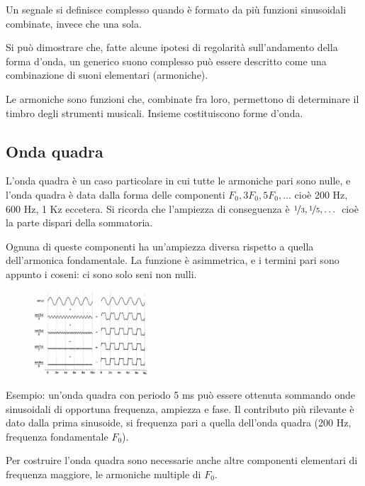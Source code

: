Un segnale si definisce complesso quando è formato da più funzioni sinusoidali combinate, invece che una sola.

Si può dimostrare che, fatte alcune ipotesi di regolarità sull'andamento della forma d'onda, un generico suono complesso può essere descritto come una combinazione di suoni elementari (armoniche).

Le armoniche sono funzioni che, combinate fra loro, permettono di determinare il timbro degli strumenti musicali. Insieme costituiscono forme d'onda. 

\subsection{Onda quadra}
L'onda quadra è un caso particolare in cui tutte le armoniche pari sono nulle, e l'onda quadra è data dalla forma delle componenti $F_0, 3F_0, 5F_0, \dots$ cioè 200 Hz, 600 Hz, 1 Kz eccetera. Si ricorda che l'ampiezza di conseguenza è $\nicefrac{1}{3}, \nicefrac{1}{5}, \dots$ cioè la parte dispari della sommatoria.

Ognuna di queste componenti ha un'ampiezza diversa rispetto a quella dell'armonica fondamentale. La funzione è asimmetrica, e i termini pari sono appunto i coseni: ci sono solo seni non nulli. 

\begin{figure}
	\begin{center}
		\vspace{-5pt}
		\includegraphics[width=0.38\textwidth]{Lezioni/Immagini/ondaquadra}
	\end{center}
	\vspace{-25pt}
\end{figure}

Esempio: un'onda quadra con periodo 5 ms può essere ottenuta sommando onde sinusoidali di opportuna frequenza, ampiezza e fase. Il contributo più rilevante è dato dalla prima sinusoide, si frequenza pari a quella dell'onda quadra (200 Hz, frequenza fondamentale $F_0$).

Per costruire l'onda quadra sono necessarie anche altre componenti elementari di frequenza maggiore, le armoniche multiple di $F_0$.

